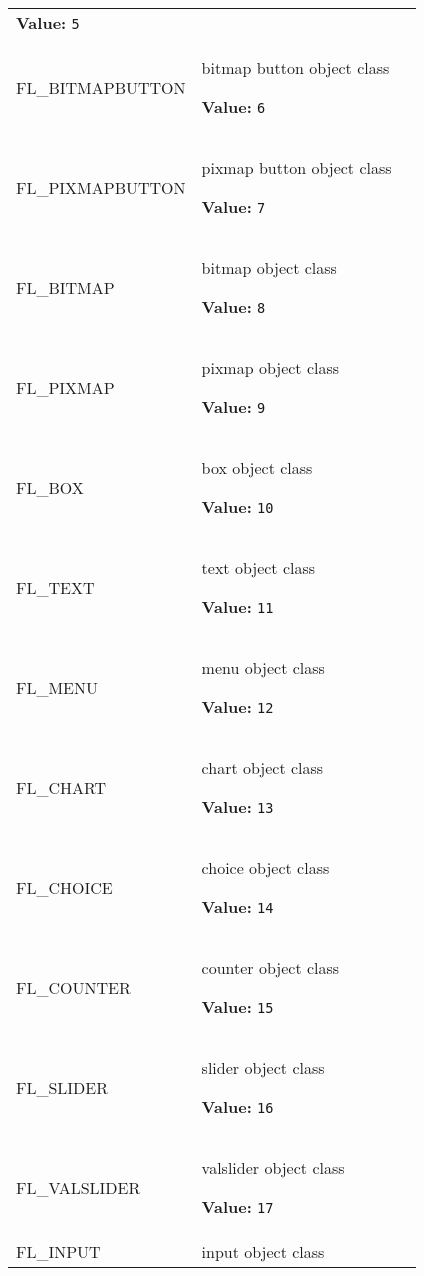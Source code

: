 \begin{longtable}{|p{\varnamewidth}|p{\vardescrwidth}|l}
\textbf{Value:} 
{\tt 5}&\\
\cline{1-2}
\raggedright F\-L\-\_\-B\-I\-T\-M\-A\-P\-B\-U\-T\-T\-O\-N\- & \raggedright bitmap button object class

\textbf{Value:} 
{\tt 6}&\\
\cline{1-2}
\raggedright F\-L\-\_\-P\-I\-X\-M\-A\-P\-B\-U\-T\-T\-O\-N\- & \raggedright pixmap button object class

\textbf{Value:} 
{\tt 7}&\\
\cline{1-2}
\raggedright F\-L\-\_\-B\-I\-T\-M\-A\-P\- & \raggedright bitmap object class

\textbf{Value:} 
{\tt 8}&\\
\cline{1-2}
\raggedright F\-L\-\_\-P\-I\-X\-M\-A\-P\- & \raggedright pixmap object class

\textbf{Value:} 
{\tt 9}&\\
\cline{1-2}
\raggedright F\-L\-\_\-B\-O\-X\- & \raggedright box object class

\textbf{Value:} 
{\tt 10}&\\
\cline{1-2}
\raggedright F\-L\-\_\-T\-E\-X\-T\- & \raggedright text object class

\textbf{Value:} 
{\tt 11}&\\
\cline{1-2}
\raggedright F\-L\-\_\-M\-E\-N\-U\- & \raggedright menu object class

\textbf{Value:} 
{\tt 12}&\\
\cline{1-2}
\raggedright F\-L\-\_\-C\-H\-A\-R\-T\- & \raggedright chart object class

\textbf{Value:} 
{\tt 13}&\\
\cline{1-2}
\raggedright F\-L\-\_\-C\-H\-O\-I\-C\-E\- & \raggedright choice object class

\textbf{Value:} 
{\tt 14}&\\
\cline{1-2}
\raggedright F\-L\-\_\-C\-O\-U\-N\-T\-E\-R\- & \raggedright counter object class

\textbf{Value:} 
{\tt 15}&\\
\cline{1-2}
\raggedright F\-L\-\_\-S\-L\-I\-D\-E\-R\- & \raggedright slider object class

\textbf{Value:} 
{\tt 16}&\\
\cline{1-2}
\raggedright F\-L\-\_\-V\-A\-L\-S\-L\-I\-D\-E\-R\- & \raggedright valslider object class

\textbf{Value:} 
{\tt 17}&\\
\cline{1-2}
\raggedright F\-L\-\_\-I\-N\-P\-U\-T\- & \raggedright input object class


\end{longtable}
